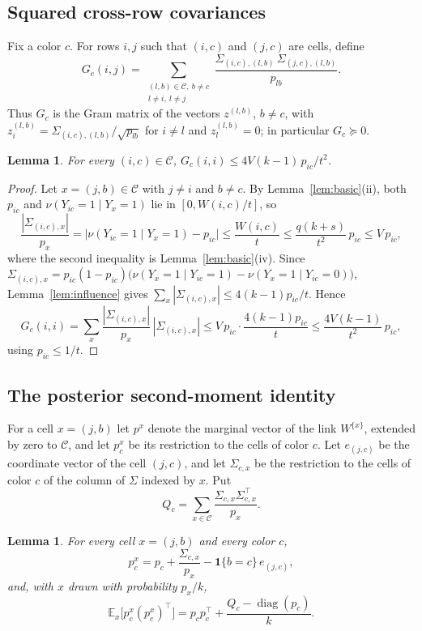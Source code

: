 \documentclass{amsart}
\numberwithin{equation}{section}
\theoremstyle{plain}
\newtheorem{lemma}[theorem]{Lemma}
\theoremstyle{definition}
\theoremstyle{remark}
\newcommand{\E}{\mathbb{E}}
\newcommand{\diag}{\operatorname{diag}}
\newcommand{\cC}{\mathcal{C}}
\newcommand{\T}{\top}
\newcommand{\one}{\mathbf{1}}
\begin{document}
\subsection{Squared cross-row covariances}
Fix a color $c$. For rows $i,j$ such that $(i,c)$ and $(j,c)$ are cells, define
\[
G_c(i,j)=\sum_{\substack{(l,b)\in\cC,\ b\ne c\\ l\ne i,\ l\ne j}}\frac{\Sigma_{(i,c),(l,b)}\,\Sigma_{(j,c),(l,b)}}{p_{lb}} .
\]
Thus $G_c$ is the Gram matrix of the vectors $z^{(l,b)}$, $b\ne c$, with $z^{(l,b)}_i=\Sigma_{(i,c),(l,b)}/\sqrt{p_{lb}}$ for $i\ne l$ and $z^{(l,b)}_l=0$; in particular $G_c\succeq0$.

\begin{lemma}\label{lem:squared}
For every $(i,c)\in\cC$, $G_c(i,i)\le4V(k-1)\,p_{ic}/t^2$.
\end{lemma}

\begin{proof}
Let $x=(j,b)\in\cC$ with $j\ne i$ and $b\ne c$. By Lemma~\ref{lem:basic}(ii), both $p_{ic}$ and $\nu(Y_{ic}=1\mid Y_x=1)$ lie in $[0,W(i,c)/t]$, so
\[
\frac{|\Sigma_{(i,c),x}|}{p_x}=\bigl|\nu(Y_{ic}=1\mid Y_x=1)-p_{ic}\bigr|\le\frac{W(i,c)}{t}\le\frac{q(k+s)}{t^2}\,p_{ic}\le V\,p_{ic},
\]
where the second inequality is Lemma~\ref{lem:basic}(iv). Since $\Sigma_{(i,c),x}=p_{ic}(1-p_{ic})\bigl(\nu(Y_x=1\mid Y_{ic}=1)-\nu(Y_x=1\mid Y_{ic}=0)\bigr)$, Lemma~\ref{lem:influence} gives $\sum_x|\Sigma_{(i,c),x}|\le4(k-1)p_{ic}/t$. Hence
\[
G_c(i,i)=\sum_x\frac{|\Sigma_{(i,c),x}|}{p_x}\,|\Sigma_{(i,c),x}|\le V\,p_{ic}\cdot\frac{4(k-1)p_{ic}}{t}\le\frac{4V(k-1)}{t^2}\,p_{ic},
\]
using $p_{ic}\le1/t$.
\end{proof}

\subsection{The posterior second-moment identity}
For a cell $x=(j,b)$ let $p^x$ denote the marginal vector of the link $W^{\{x\}}$, extended by zero to $\cC$, and let $p^x_c$ be its restriction to the cells of color $c$. Let $e_{(j,c)}$ be the coordinate vector of the cell $(j,c)$, and let $\Sigma_{c,x}$ be the restriction to the cells of color $c$ of the column of $\Sigma$ indexed by $x$. Put
\[
Q_c=\sum_{x\in\cC}\frac{\Sigma_{c,x}\Sigma_{c,x}^\T}{p_x}.
\]

\begin{lemma}\label{lem:posterior}
For every cell $x=(j,b)$ and every color $c$,
\begin{equation}\label{eq:posterior-vector}
p^x_c=p_c+\frac{\Sigma_{c,x}}{p_x}-\one\{b=c\}\,e_{(j,c)},
\end{equation}
and, with $x$ drawn with probability $p_x/k$,
\begin{equation}\label{eq:posterior}
\E_x\bigl[p^x_c(p^x_c)^\T\bigr]=p_cp_c^\T+\frac{Q_c-\diag(p_c)}{k}.
\end{equation}
\end{lemma}
\end{document}
